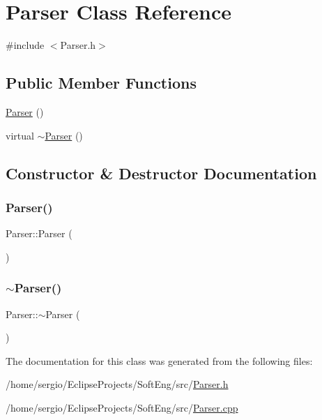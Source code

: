 \hypertarget{class_parser}{}\section{Parser Class Reference}
\label{class_parser}


{\ttfamily \#include $<$Parser.\+h$>$}

\subsection*{Public Member Functions}
\begin{DoxyCompactItemize}
\item 
\hyperlink{class_parser_a12234f6cd36b61af4b50c94a179422c1}{Parser} ()
\item 
virtual \hyperlink{class_parser_a3e658b5917a93a3ef648050d060e3a93}{$\sim$\+Parser} ()
\end{DoxyCompactItemize}


\subsection{Constructor \& Destructor Documentation}
\mbox{\label{class_parser_a12234f6cd36b61af4b50c94a179422c1}} 
\subsubsection{\texorpdfstring{Parser()}{Parser()}}
{\footnotesize\ttfamily Parser\+::\+Parser (\begin{DoxyParamCaption}{ }\end{DoxyParamCaption})}

\mbox{\label{class_parser_a3e658b5917a93a3ef648050d060e3a93}} 
\subsubsection{\texorpdfstring{$\sim$\+Parser()}{~Parser()}}
{\footnotesize\ttfamily Parser\+::$\sim$\+Parser (\begin{DoxyParamCaption}{ }\end{DoxyParamCaption})\hspace{0.3cm}{\ttfamily [virtual]}}



The documentation for this class was generated from the following files\+:\begin{DoxyCompactItemize}
\item 
/home/sergio/\+Eclipse\+Projects/\+Soft\+Eng/src/\hyperlink{_parser_8h}{Parser.\+h}\item 
/home/sergio/\+Eclipse\+Projects/\+Soft\+Eng/src/\hyperlink{_parser_8cpp}{Parser.\+cpp}\end{DoxyCompactItemize}
